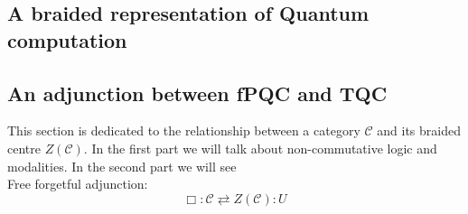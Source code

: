\documentclass{article}
\begin{document}


\subsection{A braided representation of Quantum computation}



\subsection{An adjunction between fPQC and TQC}
This section is dedicated to the relationship between a category $\mathcal{C}$ and its braided centre $Z(\mathcal{C})$. In the first part we will talk about non-commutative logic and modalities. In the second part we will see \\

Free forgetful adjunction:
$$\Box: \mathcal{C} \rightleftarrows Z(\mathcal{C}):U$$ \\
\end{document}
